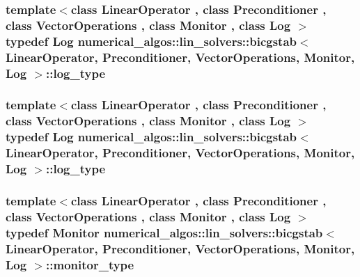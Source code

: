 \hypertarget{classnumerical__algos_1_1lin__solvers_1_1bicgstab_a89196ef8d314663bd606395a4c8a6cc1}{
\subsubsection[{log\-\_\-type}]{\setlength{\rightskip}{0pt plus 5cm}template$<$class Linear\-Operator , class Preconditioner , class Vector\-Operations , class Monitor , class Log $>$ typedef Log {\bf numerical\-\_\-algos\-::lin\-\_\-solvers\-::bicgstab}$<$ Linear\-Operator, Preconditioner, Vector\-Operations, Monitor, Log $>$\-::{\bf log\-\_\-type}}}\label{classnumerical__algos_1_1lin__solvers_1_1bicgstab_a89196ef8d314663bd606395a4c8a6cc1}
\hypertarget{classnumerical__algos_1_1lin__solvers_1_1bicgstab_a89196ef8d314663bd606395a4c8a6cc1}{
\subsubsection[{log\-\_\-type}]{\setlength{\rightskip}{0pt plus 5cm}template$<$class Linear\-Operator , class Preconditioner , class Vector\-Operations , class Monitor , class Log $>$ typedef Log {\bf numerical\-\_\-algos\-::lin\-\_\-solvers\-::bicgstab}$<$ Linear\-Operator, Preconditioner, Vector\-Operations, Monitor, Log $>$\-::{\bf log\-\_\-type}}}\label{classnumerical__algos_1_1lin__solvers_1_1bicgstab_a89196ef8d314663bd606395a4c8a6cc1}
\hypertarget{classnumerical__algos_1_1lin__solvers_1_1bicgstab_a5837507942b23f73613452c79032b795}{
\subsubsection[{monitor\-\_\-type}]{\setlength{\rightskip}{0pt plus 5cm}template$<$class Linear\-Operator , class Preconditioner , class Vector\-Operations , class Monitor , class Log $>$ typedef Monitor {\bf numerical\-\_\-algos\-::lin\-\_\-solvers\-::bicgstab}$<$ Linear\-Operator, Preconditioner, Vector\-Operations, Monitor, Log $>$\-::{\bf monitor\-\_\-type}}}\label{classnumerical__algos_1_1lin__solvers_1_1bicgstab_a5837507942b23f73613452c79032b795}
